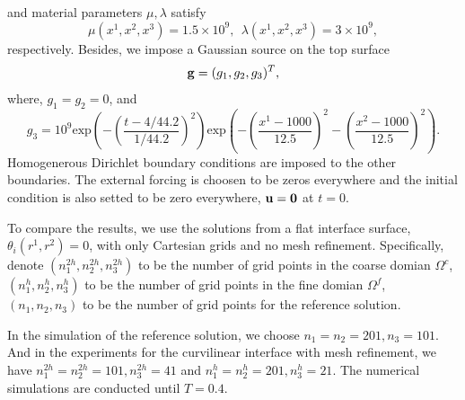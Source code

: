 and material parameters $\mu, \lambda$ satisfy
\begin{equation}
\mu(x^1,x^2,x^3) = 1.5\times 10^9,\ \ 
\lambda(x^1,x^2,x^3)  = 3\times 10^9,
\end{equation}
respectively. Besides, we impose a Gaussian source on the top surface
\[{\bf g} = (g_1,g_2,g_3)^T ,\]
where, $g_1 = g_2 = 0$, and 
\[g_3 = 10^9 \text{exp}\left(-\left(\frac{t-4/44.2}{1/44.2}\right)^2\right)\text{exp}\left(-\left(\frac{x^1-1000}{12.5}\right)^2-\left(\frac{x^2-1000}{12.5}\right)^2\right).\]
Homogenerous Dirichlet boundary conditions are imposed to the other boundaries. The external forcing is choosen to be zeros everywhere and the initial condition is also setted to be zero everywhere, ${\bf u} = {\bf 0}$ at $t = 0$.

To compare the results, we use the solutions from a flat interface surface, $\theta_i(r^1,r^2) = 0$, with only Cartesian grids and no mesh refinement. Specifically, denote $(n_1^{2h},n_2^{2h},n_3^{2h})$ to be the number of grid points in the coarse domian $\Omega^c$, $(n_1^h,n_2^h,n_3^h)$ to be the number of grid points in the fine domian $\Omega^f$, $(n_1,n_2,n_3)$ to be the number of grid points for the reference solution.

In the simulation of the reference solution, we choose $n_1 = n_2 = 201, n_3 = 101$. And in the experiments for the curvilinear interface with mesh refinement, we have $n_1^{2h} = n_2^{2h} = 101, n_3^{2h} = 41$ and $n_1^h = n_2^h = 201, n_3^h = 21$. The numerical simulations are conducted until $T = 0.4$.

